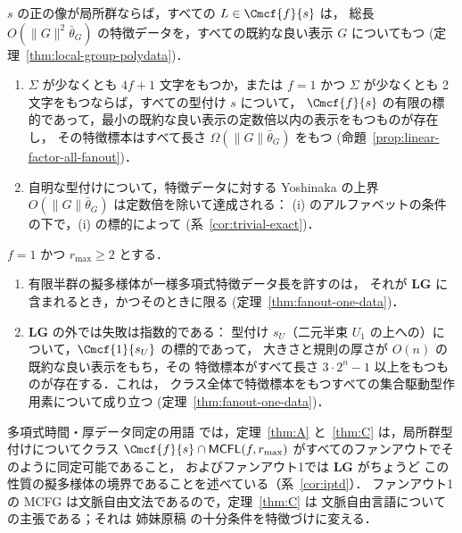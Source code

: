 \begin{mainthm}[局所群]
\label{thm:A}
$s$ の正の像が局所群ならば，すべての $L\in\Cmcf{f}{s}$ は，
総長 $O(\|G\|^2\bar\theta_G)$ の特徴データを，すべての既約な良い表示 $G$ についてもつ
\textup(定理~\ref{thm:local-group-polydata}\textup)．
\end{mainthm}

\begin{mainthm}[線形因子]
\label{thm:B}
\begin{enumerate}[label=\textup{(\roman*)},leftmargin=*]
\item $\Sigma$ が少なくとも $4f+1$ 文字をもつか，または $f=1$ かつ $\Sigma$ が少なくとも
2文字をもつならば，すべての型付け $s$ について，
$\Cmcf{f}{s}$ の有限の標的であって，最小の既約な良い表示の定数倍以内の表示をもつものが存在し，
その特徴標本はすべて長さ
$\Omega(\|G\|\bar\theta_G)$ をもつ
\textup(命題~\ref{prop:linear-factor-all-fanout}\textup)．
\item 自明な型付けについて，特徴データに対する Yoshinaka の上界 $O(\|G\|\bar\theta_G)$
\cite{Yoshinaka2011} は定数倍を除いて達成される：
\textup{(i)} のアルファベットの条件の下で，\textup{(i)} の標的によって
\textup(系~\ref{cor:trivial-exact}\textup)．
\end{enumerate}
\end{mainthm}

\begin{mainthm}
\label{thm:C}
$f=1$ かつ $r_{\max}\ge2$ とする．
\begin{enumerate}[label=\textup{(\roman*)},leftmargin=*]
\item 有限半群の擬多様体が一様多項式特徴データ長を許すのは，
それが $\mathbf{LG}$ に含まれるとき，かつそのときに限る
\textup(定理~\ref{thm:fanout-one-data}\textup)．
\item $\mathbf{LG}$ の外では失敗は指数的である：
型付け $s_U$（二元半束 $U_1$ の上への）について，$\Cmcf{1}{s_U}$ の標的であって，
大きさと規則の厚さが $O(n)$ の既約な良い表示をもち，その
特徴標本がすべて長さ $3\cdot2^n-1$ 以上をもつものが存在する．これは，
クラス全体で特徴標本をもつすべての集合駆動型作用素について成り立つ
\textup(定理~\ref{thm:fanout-one-data}\textup)．
\end{enumerate}
\end{mainthm}

多項式時間・厚データ同定の用語
\cite{Yoshinaka2008,EyraudHeinzYoshinaka2016} では，定理~\ref{thm:A}
と~\ref{thm:C} は，局所群型付けについてクラス
$\Cmcf{f}{s}\cap\mathsf{MCFL}(f,r_{\max})$ がすべてのファンアウトでそのように同定可能であること，
およびファンアウト1では $\mathbf{LG}$ がちょうど
この性質の擬多様体の境界であることを述べている（系~\ref{cor:iptd}）．
ファンアウト1の MCFG は文脈自由文法であるので，定理~\ref{thm:C} は
文脈自由言語についての主張である；それは
姉妹原稿 \cite{kuriyamaCFG} の十分条件を特徴づけに変える．

